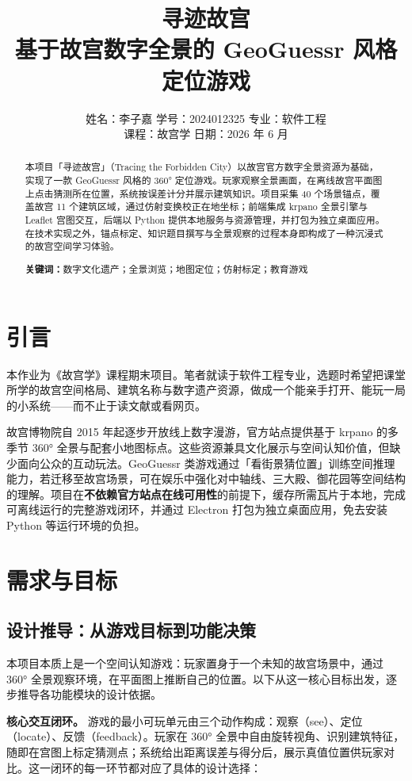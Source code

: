\documentclass[UTF8,a4paper,12pt]{ctexart}
\title{\textbf{寻迹故宫}\\[0.4em]
  \large 基于故宫数字全景的 GeoGuessr 风格定位游戏}
\author{%
  姓名：李子嘉 \quad
  学号：2024012325 \quad
  专业：软件工程 \\[0.3em]
  课程：故宫学 \quad
  日期：2026 年 6 月
}
\date{}
\begin{document}
\maketitle
\begin{abstract}
  本项目「寻迹故宫」（Tracing the Forbidden City）以故宫官方数字全景资源为基础，实现了一款 GeoGuessr 风格的 360° 定位游戏。玩家观察全景画面，在离线故宫平面图上点击猜测所在位置，系统按误差计分并展示建筑知识。项目采集 40 个场景锚点，覆盖故宫 11 个建筑区域，通过仿射变换校正在地坐标；前端集成 krpano 全景引擎与 Leaflet 宫图交互，后端以 Python 提供本地服务与资源管理，并打包为独立桌面应用。在技术实现之外，锚点标定、知识题目撰写与全景观察的过程本身即构成了一种沉浸式的故宫空间学习体验。
  \vspace{0.5em}

  \noindent\textbf{关键词：}数字文化遗产；全景浏览；地图定位；仿射标定；教育游戏
\end{abstract}
\section{引言}
本作业为《故宫学》课程期末项目。笔者就读于软件工程专业，选题时希望把课堂所学的故宫空间格局、建筑名称与数字遗产资源，做成一个能亲手打开、能玩一局的小系统——而不止于读文献或看网页。

故宫博物院自 2015 年起逐步开放线上数字漫游，官方站点提供基于 krpano 的多季节 360° 全景与配套小地图标点。这些资源兼具文化展示与空间认知价值，但缺少面向公众的互动玩法。GeoGuessr 类游戏通过「看街景猜位置」训练空间推理能力，若迁移至故宫场景，可在娱乐中强化对中轴线、三大殿、御花园等空间结构的理解。项目在\textbf{不依赖官方站点在线可用性}的前提下，缓存所需瓦片于本地，完成可离线运行的完整游戏闭环，并通过 Electron 打包为独立桌面应用，免去安装 Python 等运行环境的负担。
\section{需求与目标}
\subsection{设计推导：从游戏目标到功能决策}

本项目本质上是一个空间认知游戏：玩家置身于一个未知的故宫场景中，通过 360° 全景观察环境，在平面图上推断自己的位置。以下从这一核心目标出发，逐步推导各功能模块的设计依据。

\textbf{核心交互闭环。} 游戏的最小可玩单元由三个动作构成：观察（see）、定位（locate）、反馈（feedback）。玩家在 360° 全景中自由旋转视角、识别建筑特征，随即在宫图上标定猜测点；系统给出距离误差与得分后，展示真值位置供玩家对比。这一闭环的每一环节都对应了具体的设计选择：
\end{document}
